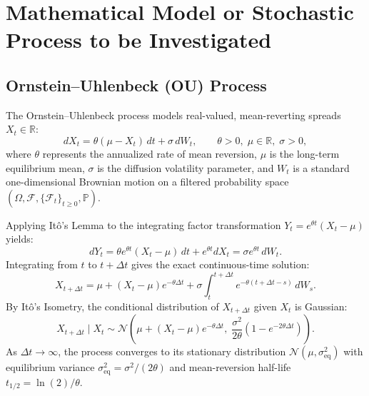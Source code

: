 \documentclass[11pt,a4paper]{article}
\begin{document}
\section{Mathematical Model or Stochastic Process to be Investigated}

\subsection{Ornstein--Uhlenbeck (OU) Process}
The Ornstein--Uhlenbeck process models real-valued, mean-reverting spreads $X_t \in \mathbb{R}$:
\begin{equation}
dX_t = \theta(\mu - X_t)\,dt + \sigma\,dW_t, \qquad \theta > 0,\; \mu \in \mathbb{R},\; \sigma > 0,
\label{eq:ou_sde}
\end{equation}
where $\theta$ represents the annualized rate of mean reversion, $\mu$ is the long-term equilibrium mean, $\sigma$ is the diffusion volatility parameter, and $W_t$ is a standard one-dimensional Brownian motion on a filtered probability space $(\Omega, \mathcal{F}, \{\mathcal{F}_t\}_{t \ge 0}, \mathbb{P})$.

Applying It\^o's Lemma to the integrating factor transformation $Y_t = e^{\theta t}(X_t - \mu)$ yields:
\begin{equation}
dY_t = \theta e^{\theta t}(X_t - \mu)\,dt + e^{\theta t}dX_t = \sigma e^{\theta t}\,dW_t.
\end{equation}
Integrating from $t$ to $t + \Delta t$ gives the exact continuous-time solution:
\begin{equation}
X_{t+\Delta t} = \mu + (X_t - \mu)e^{-\theta \Delta t} + \sigma \int_t^{t+\Delta t} e^{-\theta(t+\Delta t - s)}\,dW_s.
\end{equation}
By It\^o's Isometry, the conditional distribution of $X_{t+\Delta t}$ given $X_t$ is Gaussian:
\begin{equation}
X_{t+\Delta t} \mid X_t \sim \mathcal{N}\!\left(\mu + (X_t - \mu)e^{-\theta \Delta t},\; \frac{\sigma^2}{2\theta}\left(1 - e^{-2\theta \Delta t}\right)\right).
\label{eq:ou_trans}
\end{equation}
As $\Delta t \to \infty$, the process converges to its stationary distribution $\mathcal{N}(\mu, \sigma_{\mathrm{eq}}^2)$ with equilibrium variance $\sigma_{\mathrm{eq}}^2 = \sigma^2 / (2\theta)$ and mean-reversion half-life $t_{1/2} = \ln(2)/\theta$.
\end{document}
